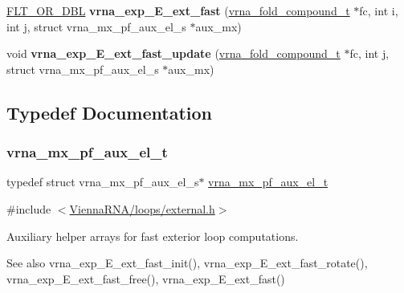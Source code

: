 \begin{DoxyCompactItemize}
\hyperlink{group__data__structures_ga31125aeace516926bf7f251f759b6126}{F\+L\+T\+\_\+\+O\+R\+\_\+\+D\+BL} {\bfseries vrna\+\_\+exp\+\_\+\+E\+\_\+ext\+\_\+fast} (\hyperlink{group__fold__compound_ga1b0cef17fd40466cef5968eaeeff6166}{vrna\+\_\+fold\+\_\+compound\+\_\+t} $\ast$fc, int i, int j, struct vrna\+\_\+mx\+\_\+pf\+\_\+aux\+\_\+el\+\_\+s $\ast$aux\+\_\+mx)
\item 
\mbox{\label{group__eval__loops__ext_gaceb115e3d8855129797620b3b26882d5}} 
void {\bfseries vrna\+\_\+exp\+\_\+\+E\+\_\+ext\+\_\+fast\+\_\+update} (\hyperlink{group__fold__compound_ga1b0cef17fd40466cef5968eaeeff6166}{vrna\+\_\+fold\+\_\+compound\+\_\+t} $\ast$fc, int j, struct vrna\+\_\+mx\+\_\+pf\+\_\+aux\+\_\+el\+\_\+s $\ast$aux\+\_\+mx)
\end{DoxyCompactItemize}


\subsection{Typedef Documentation}
\mbox{\label{group__eval__loops__ext_gaf9d5160c11ffad3ec258124a77fee13c}} 
\subsubsection{\texorpdfstring{vrna\+\_\+mx\+\_\+pf\+\_\+aux\+\_\+el\+\_\+t}{vrna\_mx\_pf\_aux\_el\_t}}
{\footnotesize\ttfamily typedef struct vrna\+\_\+mx\+\_\+pf\+\_\+aux\+\_\+el\+\_\+s$\ast$ \hyperlink{group__eval__loops__ext_gaf9d5160c11ffad3ec258124a77fee13c}{vrna\+\_\+mx\+\_\+pf\+\_\+aux\+\_\+el\+\_\+t}}



{\ttfamily \#include $<$\hyperlink{external_8h}{Vienna\+R\+N\+A/loops/external.\+h}$>$}



Auxiliary helper arrays for fast exterior loop computations. 

\begin{DoxySeeAlso}{See also}
vrna\+\_\+exp\+\_\+\+E\+\_\+ext\+\_\+fast\+\_\+init(), vrna\+\_\+exp\+\_\+\+E\+\_\+ext\+\_\+fast\+\_\+rotate(), vrna\+\_\+exp\+\_\+\+E\+\_\+ext\+\_\+fast\+\_\+free(), vrna\+\_\+exp\+\_\+\+E\+\_\+ext\+\_\+fast() 
\end{DoxySeeAlso}


